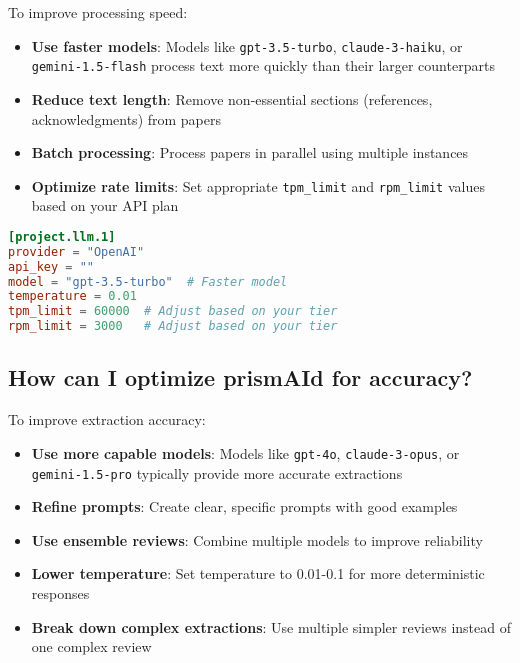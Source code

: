 To improve processing speed:

\begin{itemize}
    \item \textbf{Use faster models}: Models like \texttt{gpt-3.5-turbo}, \texttt{claude-3-haiku}, or \texttt{gemini-1.5-flash} process text more quickly than their larger counterparts
    \item \textbf{Reduce text length}: Remove non-essential sections (references, acknowledgments) from papers
    \item \textbf{Batch processing}: Process papers in parallel using multiple instances
    \item \textbf{Optimize rate limits}: Set appropriate \texttt{tpm\_limit} and \texttt{rpm\_limit} values based on your API plan
\end{itemize}

\begin{configbox}
\begin{lstlisting}[language=TOML]
[project.llm.1]
provider = "OpenAI"
api_key = ""
model = "gpt-3.5-turbo"  # Faster model
temperature = 0.01
tpm_limit = 60000  # Adjust based on your tier
rpm_limit = 3000   # Adjust based on your tier
\end{lstlisting}
\end{configbox}


\subsection{How can I optimize prismAId for accuracy?}

To improve extraction accuracy:

\begin{itemize}
    \item \textbf{Use more capable models}: Models like \texttt{gpt-4o}, \texttt{claude-3-opus}, or \texttt{gemini-1.5-pro} typically provide more accurate extractions
    \item \textbf{Refine prompts}: Create clear, specific prompts with good examples
    \item \textbf{Use ensemble reviews}: Combine multiple models to improve reliability
    \item \textbf{Lower temperature}: Set temperature to 0.01-0.1 for more deterministic responses
    \item \textbf{Break down complex extractions}: Use multiple simpler reviews instead of one complex review
\end{itemize}

